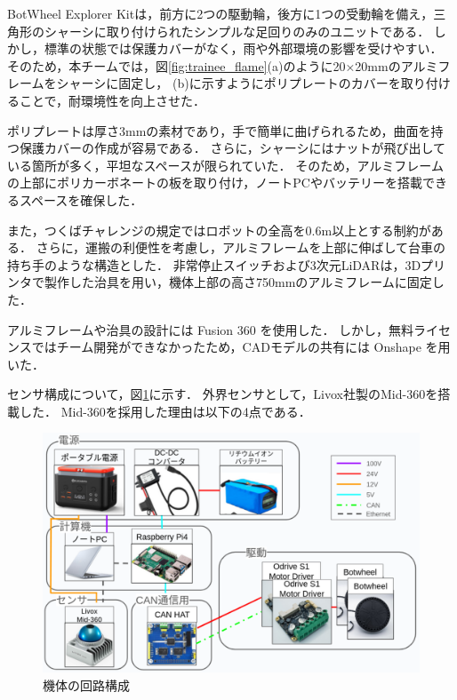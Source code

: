 \documentclass[twocolumn,9pt]{jsproceedings}
\begin{document}
BotWheel Explorer Kitは，前方に2つの駆動輪，後方に1つの受動輪を備え，三角形のシャーシに取り付けられたシンプルな足回りのみのユニットである．
しかし，標準の状態では保護カバーがなく，雨や外部環境の影響を受けやすい．
そのため，本チームでは，図\ref{fig:trainee_flame}(a)のように20×20mmのアルミフレームをシャーシに固定し，
(b)に示すようにポリプレートのカバーを取り付けることで，耐環境性を向上させた\cite{PE960_1}．

ポリプレートは厚さ3mmの素材であり，手で簡単に曲げられるため，曲面を持つ保護カバーの作成が容易である．
さらに，シャーシにはナットが飛び出している箇所が多く，平坦なスペースが限られていた．
そのため，アルミフレームの上部にポリカーボネートの板を取り付け，ノートPCやバッテリーを搭載できるスペースを確保した．

また，つくばチャレンジの規定ではロボットの全高を0.6m以上とする制約がある．
さらに，運搬の利便性を考慮し，アルミフレームを上部に伸ばして台車の持ち手のような構造とした．
非常停止スイッチおよび3次元LiDARは，3Dプリンタで製作した治具を用い，機体上部の高さ750mmのアルミフレームに固定した．

アルミフレームや治具の設計には Fusion 360 \cite{Fusion360} を使用した．
しかし，無料ライセンスではチーム開発ができなかったため，CADモデルの共有には Onshape \cite{Onshape} を用いた．


センサ構成について，図\ref{fig:botwheel-explorer-schematic}に示す．
外界センサとして，Livox社製のMid-360\cite{mid360}を搭載した．
Mid-360を採用した理由は以下の4点である．
\begin{figure}[h]
  \begin{center}
    \includegraphics[width=1.0\linewidth]{figs/botwheel-explorer-schematic.pdf}
    \caption{機体の回路構成}
    \label{fig:botwheel-explorer-schematic}
  \end{center}
\end{figure}
\end{document}
